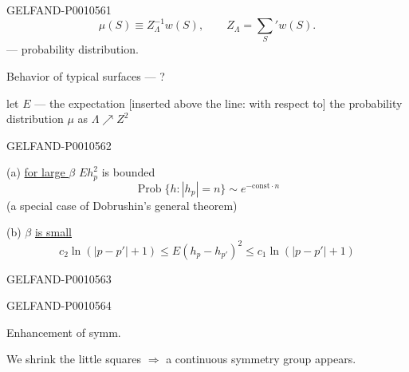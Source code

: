 \begin{GelfandAdjacentEvidence}{GELFAND-P001056}{1}
\begin{equation*}
\mu(S)\equiv Z_\Lambda^{-1}w(S),\qquad Z_\Lambda=\sum_S' w(S).
\tag{4}
\end{equation*}
— probability distribution.

Behavior of typical surfaces — ?

 let \(E\) — the expectation [inserted above the line: with respect to] the probability distribution \(\mu\) as \(\Lambda\nearrow Z^2\)
\end{GelfandAdjacentEvidence}
\begin{GelfandAdjacentEvidence}{GELFAND-P001056}{2}


(a) \underline{for large \(\beta\)} \(Eh_p^2\) is bounded
\begin{equation*}
\operatorname{Prob}\{h:|h_p|=n\}\sim e^{-\mathrm{const}\cdot n}
\tag{5}
\end{equation*}
(a special case of Dobrushin’s general theorem)

(b) \(\beta\) \underline{is small}
\begin{equation*}
c_2\ln(|p-p'|+1)\leqslant E(h_p-h_{p'})^2\leqslant c_1\ln(|p-p'|+1)
\tag{6}
\end{equation*}
\end{GelfandAdjacentEvidence}
\begin{GelfandAdjacentEvidence}{GELFAND-P001056}{3}

\end{GelfandAdjacentEvidence}
\begin{GelfandAdjacentEvidence}{GELFAND-P001056}{4}


Enhancement of symm.

We shrink the little squares \(\Rightarrow\) a continuous symmetry group appears.
\end{GelfandAdjacentEvidence}
